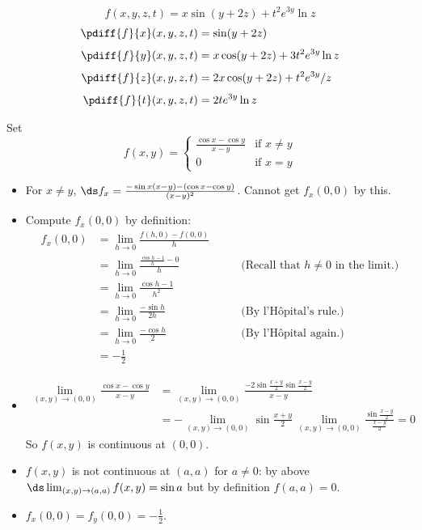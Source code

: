 \begin{eg}\label{eg partials C}
\begin{equation*}
f(x,y,z,t) = x\sin(y+2z) +t^2e^{3y}\ln z
\end{equation*}
\begin{align*}
\pdiff{f}{x}(x,y,z,t) &= \sin(y+2z)  \\[0.05in]
\pdiff{f}{y}(x,y,z,t) &= x\cos(y+2z) +3t^2e^{3y}\ln z \\[0.05in]
\pdiff{f}{z}(x,y,z,t) &= 2x\cos(y+2z) +t^2e^{3y}/z \\[0.05in]
\pdiff{f}{t}(x,y,z,t) &= 2te^{3y}\ln z
\end{align*}
\end{eg}
\begin{eg}\label{eg partials D}
Set
\begin{equation*}
f(x,y)=\begin{cases}
\frac{\cos x-\cos y}{x-y}&\text{if $x\ne y$}\\
0&\text{if $x=y$}
\end{cases}
\end{equation*}
\begin{itemize}
\item For $x\ne y$, $\ds f_x = \frac{-\sin x(x - y) - (\cos x - \cos y)}{(x - y)^2}$. Cannot get $f_x(0, 0)$ by this.
\item Compute $f_x(0, 0)$ by definition:
\begin{align*}
f_x(0,0) &= \lim_{h\rightarrow 0}\frac{f(h,0)-f(0,0)}{h} \\
&= \lim_{h\rightarrow 0}\frac{\frac{\cos h-1}{h}-0}{h}
&\qquad\text{(Recall that $h\ne 0$ in the limit.)} \\
&= \lim_{h\rightarrow 0}\frac{\cos h-1}{h^2} \\
&= \lim_{h\rightarrow 0}\frac{-\sin h}{2h}
&\qquad\text{(By l'H\^opital's rule.)} \\
&= \lim_{h\rightarrow 0}\frac{-\cos h}{2}
&\qquad\text{(By l'H\^opital again.)} \\
&=-\frac{1}{2}
\end{align*}
\item
\begin{align*}
\lim_{(x, y)\to (0, 0)} \frac{\cos x - \cos y}{x - y} &= \lim_{(x, y)\to (0, 0)}\frac{-2\sin\frac{x+y}{2}\sin\frac{x-y}{2}}{x - y} \\
&= -\lim_{(x, y)\to (0, 0)}\sin\frac{x+y}{2}\,\lim_{(x, y)\to (0, 0)}\frac{\sin\frac{x-y}{2}}{\frac{x - y}{2}} = 0
\end{align*}
So $f(x,y)$ is continuous at $(0,0)$.
\item
$f(x, y)$ is not continuous at $(a, a)$ for $a\ne 0$: by above $\ds\lim_{(x, y)\to(a, a)}f(x, y) = \sin a$ but by definition $f(a, a) = 0$.
\item
$f_x(0, 0) = f_y(0, 0) = -\frac{1}{2}$.
\end{itemize}
\end{eg}
